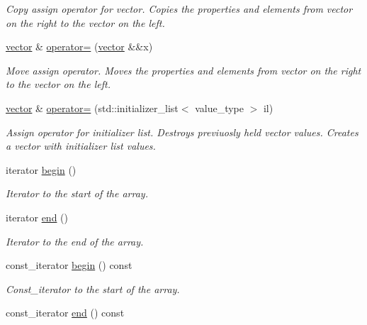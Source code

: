 \begin{DoxyCompactItemize}
\begin{DoxyCompactList}\small\item\em Copy assign operator for vector. Copies the properties and elements from vector on the right to the vector on the left. \end{DoxyCompactList}\item 
\mbox{\hyperlink{classfake_1_1vector}{vector}} \& \mbox{\hyperlink{classfake_1_1vector_a3f7710f0e21f7531d24908bc82548f2b}{operator=}} (\mbox{\hyperlink{classfake_1_1vector}{vector}} \&\&x)
\begin{DoxyCompactList}\small\item\em Move assign operator. Moves the properties and elements from vector on the right to the vector on the left. \end{DoxyCompactList}\item 
\mbox{\hyperlink{classfake_1_1vector}{vector}} \& \mbox{\hyperlink{classfake_1_1vector_a7c88fffd66b9f4b518098681050904b6}{operator=}} (std\+::initializer\+\_\+list$<$ value\+\_\+type $>$ il)
\begin{DoxyCompactList}\small\item\em Assign operator for initializer list. Destroys previuosly held vector values. Creates a vector with initializer list values. \end{DoxyCompactList}\item 
iterator \mbox{\hyperlink{classfake_1_1vector_aaf161eda743ae8c669aa5be71f3ff8a7}{begin}} ()
\begin{DoxyCompactList}\small\item\em Iterator to the start of the array. \end{DoxyCompactList}\item 
iterator \mbox{\hyperlink{classfake_1_1vector_aa8b27b92fd87317d279876243372fdfe}{end}} ()
\begin{DoxyCompactList}\small\item\em Iterator to the end of the array. \end{DoxyCompactList}\item 
const\+\_\+iterator \mbox{\hyperlink{classfake_1_1vector_ad3567fd79465f31fe2bd26cb2eb85e2b}{begin}} () const
\begin{DoxyCompactList}\small\item\em Const\+\_\+iterator to the start of the array. \end{DoxyCompactList}\item 
const\+\_\+iterator \mbox{\hyperlink{classfake_1_1vector_a76f745c7d40fc82937f201dd22cd95d8}{end}} () const

\end{DoxyCompactItemize}
